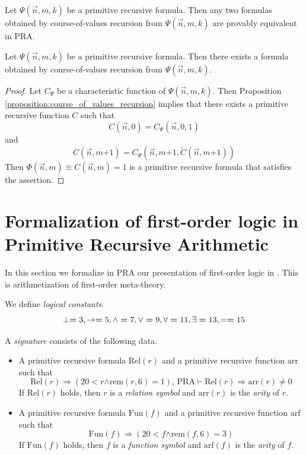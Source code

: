 \documentclass[10pt]{amsart}
\newcommand{\mra}{\boldsymbol{\Rightarrow}}
\newcommand{\mand}{\boldsymbol{\wedge}}
\newcommand{\mle}{\boldsymbol{<}}
\newcommand{\meq}{\boldsymbol{=}}
\newcommand{\mneq}{\boldsymbol{\neq}}
\newcommand{\mplus}{\boldsymbol{+}}
\begin{document}
\begin{remark}\label{remark:all_course_of_values_formulas_are_equivalent}
	Let $\Psi(\vec{n},m,k)$ be a primitive recursive formula. Then any two formulas obtained by course-of-values recursion from $\Psi(\vec{n},m,k)$ are provably equivalent in $\mathrm{PRA}$.
\end{remark}

\begin{corollary}\label{corollary:primitive_recursive_formulas_can_be_defined_by_course_of_values_recursion}
	Let $\Psi(\vec{n},m,k)$ be a primitive recursive formula. Then there exists a formula obtained by course-of-values recursion from $\Psi(\vec{n},m,k)$.
\end{corollary}
\begin{proof}
	Let $C_{\Psi}$ be a characteristic function of $\Psi(\vec{n},m,k)$. Then Proposition \ref{proposition:course_of_values_recursion} implies that there exists a primitive recursive function $C$ such that
	$$C(\vec{n},0) \meq C_{\Psi}(\vec{n},0,1)$$
	and
	$$C(\vec{n},m \mplus 1) \meq C_{\Psi}\left(\vec{n},m \mplus 1,\tilde{C}(\vec{n},m \mplus 1)\right)$$
	Then $\Phi(\vec{n},m) \equiv C(\vec{n},m) \meq 1$ is a primitive recursive formula that satisfies the assertion.
\end{proof}

\section{Formalization of first-order logic in Primitive Recursive Arithmetic}
\noindent
In this section we formalize in $\mathrm{PRA}$ our presentation of first-order logic in \cite{Systems_of_first_order_logic}. This is arithmetization of first-order meta-theory.

\begin{definition}
	We define \textit{logical constants}.
	$$\perp \meq 3,\ra \meq 5,\wedge \meq 7,\vee \meq 9, \forall \meq 11, \exists \meq 13, = \meq 15$$
\end{definition}

\begin{definition}
	A \textit{signature} consists of the following data.
	\begin{itemize}
		\item A primitive recursive formula $\mathrm{Rel}(r)$ and a primitive recursive function $\mathrm{arr}$ such that
		      $$\mathrm{Rel}(r) \mra \left(20 \mle r \mand \mathrm{rem}(r,6) \meq 1\right),\,\mathrm{PRA}\vdash \mathrm{Rel}(r) \mra \mathrm{arr}(r) \mneq 0$$
		      If $\mathrm{Rel}(r)$ holds, then $r$ is a \textit{relation symbol} and $\mathrm{arr}(r)$ is the \textit{arity} of $r$.
		\item A primitive recursive formula $\mathrm{Fun}(f)$ and a primitive recursive function $\mathrm{arf}$ such that
		      $$\mathrm{Fun}(f) \mra \left(20 \mle f \mand \mathrm{rem}(f,6) \meq 3\right)$$
		      If $\mathrm{Fun}(f)$ holds, then $f$ is a \textit{function symbol} and $\mathrm{arf}(f)$ is the \textit{arity} of $f$.
	\end{itemize}
\end{definition}
\end{document}
